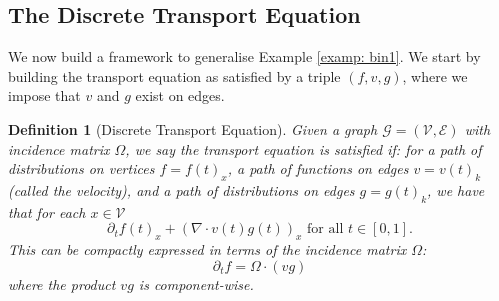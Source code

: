 \documentclass[conference]{IEEEtran}
\newcommand{\GG}{\mathcal{G}}
\newcommand{\VV}{\mathcal{V}}
\newcommand{\EE}{\mathcal{E}}
\theoremstyle{ieeestyle}
\newtheorem{defn}{Definition}
\begin{document}
\subsection{The Discrete Transport Equation}
We now build a framework to generalise Example \ref{examp: bin1}. We start by building the transport equation as satisfied by a triple $(f,v,g)$, where we impose that $v$ and $g$ exist on edges.
\begin{defn}[Discrete Transport Equation]
    Given a graph $\GG = (\VV,\EE)$ with incidence matrix $\Omega$, we say the transport equation is satisfied if: for a path of distributions on vertices $f = f(t)_x$, a path of functions on edges $v = v(t)_k$ (called the velocity), and a path of distributions on edges $g = g(t)_k$, we have that for each $x \in \VV$
    \begin{equation}\label{eq: original}
        \partial_t f(t)_x + (\nabla \cdot v(t)g(t))_x \text{ for all }  t \in [0,1].
    \end{equation}
    This can be compactly expressed in terms of the incidence matrix $\Omega$:
    \begin{equation}\label{eq: matrix}
        \partial_t f = \Omega \cdot (vg)
    \end{equation}
    where the product $vg$ is component-wise.
\end{defn}
\end{document}
